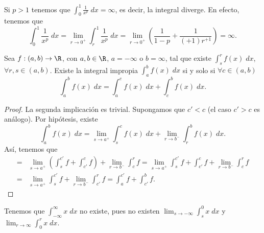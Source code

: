 \begin{observation}
\normalfont Si $\displaystyle p > 1 $ tenemos que $\displaystyle \int^{1}_{0} \frac{1}{x^{p}} \; dx = \infty $, es decir, la integral diverge. En efecto, tenemos que
\[\int^{1}_{0} \frac{1}{x^{p}} \; dx = \lim_{r \to 0^{+}}\int^{1}_{r} \frac{1}{x^{p}} \; dx = \lim_{r \to 0^{+}}\left(\frac{1}{1-p}+\frac{1}{\left(+1\right)r^{+1}}\right) = \infty .\]
\end{observation}
\begin{fprop}[]
\normalfont Sea $\displaystyle f : \left(a,b\right) \to \R $, con $\displaystyle a,b \in \R $, $\displaystyle a = - \infty $ o $\displaystyle b = \infty $, tal que existe $\displaystyle \int^{r}_{s} f\left(x\right) \; dx $, $\displaystyle \forall r,s \in \left(a,b\right)$. Existe la integral impropia $\displaystyle \int^{b}_{a} f\left(x\right) \; dx $ si y solo si $\displaystyle \forall c \in \left(a,b\right) $ 
\[\int^{b}_{a} f\left(x\right) \; dx = \int^{c}_{a} f\left(x\right) \; dx + \int^{b}_{c} f\left(x\right) \; dx .\]
\end{fprop}
\begin{proof}
La segunda implicación es trivial. Supongamos que $\displaystyle c' < c $ (el caso $\displaystyle c'>c $ es análogo). Por hipótesis, existe
\[ \int^{b}_{a} f\left(x\right) \; dx = \lim_{s \to a^{+}}\int^{c}_{s} f\left(x\right) \; dx + \lim_{r \to b^{-}}\int^{b}_{r} f\left(x\right) \; dx .\]
Así, tenemos que
\[
\begin{split}
	= & \lim_{s \to a^{+}}\left(\int^{c'}_{s} f + \int^{c}_{c'} f \right) + \lim_{r \to b^{-}} \int^{r}_{c} f = \lim_{s \to a^{+}}\int^{c'}_{s} f + \int^{c}_{c'} f +\lim_{r \to b^{-}}\int^{r}_{c} f \\
	= & \lim_{s \to a^{+}} \int^{c'}_{s} f +\lim_{r \to b^{-}}\int^{r}_{c'} f = \int^{c'}_{a} f + \int^{b}_{c'} f.
\end{split}
\]
\end{proof}
\begin{eg}
\normalfont Tenemos que $\displaystyle \int^{\infty}_{-\infty} x \; dx $ no existe, pues no existen $\displaystyle \lim_{s \to -\infty}\int^{0}_{s} x \; dx $ y $\displaystyle \lim_{r \to \infty}\int^{r}_{0} x \; dx $. 
\end{eg}

